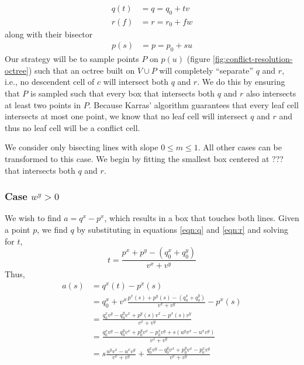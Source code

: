 \documentclass{egpubl}
\begin{document}
\begin{align}
q(t) &= q = q_0 + tv \label{eqn:q} \\
r(f) &= r = r_0 + fw \label{eqn:r}
\end{align}
along with their bisector
\begin{align}
p(s) &= p = p_0 + su \label{eqn:p}
\end{align}
Our strategy will be to sample points $P$ on $p(u)$ (figure \ref{fig:conflict-resolution-octree}) such that an octree built on $V \cup P$ will completely ``separate'' $q$ and $r$, i.e., no descendent cell of $c$ will intersect both $q$ and $r$. We do this by ensuring that $P$ is sampled such that every box that intersects both $q$ and $r$ also intersects at least two points in $P$. Because Karras' algorithm guarantees that every leaf cell intersects at most one point, we know that no leaf cell will intersect $q$ and $r$ and thus no leaf cell will be a conflict cell.

We consider only bisecting lines with slope $0 \le m \le 1$. All other cases can be transformed to this case. We begin by fitting the smallest box centered at ??? that intersects both $q$ and $r$.

\subsubsection{Case $w^y>0$}

We wish to find $a = q^x-p^x$, which results in a box that touches both lines. Given a point $p$, we find $q$ by substituting in equations \eqref{eqn:q} and \eqref{eqn:r} and solving for $t$,
\begin{equation}
t = \frac{p^x+p^y-(q_0^x+q_0^y)}{v^x+v^y}
\end{equation}
Thus,
\begin{align} 
a(s) &= q^x(t) - p^x(s) \nonumber \\
   &= q_0^x + v^x\frac{p^x(s)+p^y(s)-(q_0^x+q_0^y)}{v^x+v^y} - p^x(s) \nonumber \\
   &= \frac{q_0^xv^y-q_0^yv^x+p^y(s)v^x-p^x(s)v^y}{v^x+v^y} \nonumber \\
   &= \frac{q_0^xv^y-q_0^yv^x+p_0^yv^x-p_0^xv^y+s(u^yv^x-u^xv^y)}{v^x+v^y} \nonumber \\
   &= s\frac{u^yv^x-u^xv^y}{v^x+v^y}+\frac{q_0^xv^y-q_0^yv^x+p_0^yv^x-p_0^xv^y}{v^x+v^y} \label{eqn:a}
\end{align}
\end{document}
